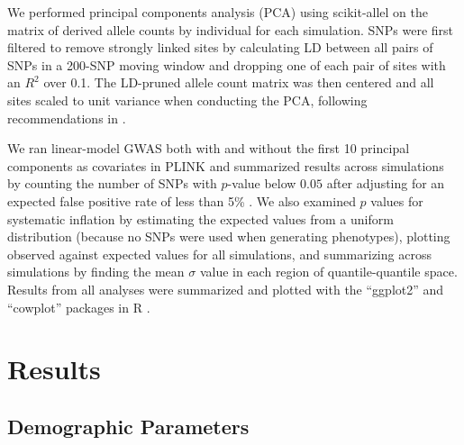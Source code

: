 \documentclass[10pt,twoside,lineno,hidelinks]{preprint}
\begin{document}
We performed principal components analysis (PCA) using scikit-allel \citep{Miles2017} on the matrix of derived allele counts by individual for each simulation. 
SNPs were first filtered to remove strongly linked sites by calculating LD between all pairs of SNPs in a 200-SNP moving window and dropping one of each pair of sites with an $R^2$ over 0.1. The LD-pruned allele count matrix was then centered and all sites scaled to unit variance when conducting the PCA, following recommendations in \citet{Patterson2006}.   

We ran linear-model GWAS both with and without the first 10 principal components as covariates in PLINK and summarized results across simulations by counting the number of SNPs 
with $p$-value below $0.05$ after adjusting for an expected false positive rate of less than 5\% \citep{benjamini2001control}. 
We also examined $p$ values for systematic inflation 
by estimating the expected values from a uniform distribution (because no SNPs were used when generating phenotypes), plotting observed against expected values for all simulations, and summarizing across simulations by finding the mean $\sigma$ value in each region of quantile-quantile space. 
Results from all analyses were summarized and plotted with the ``ggplot2'' \citep{Wickham2016} and ``cowplot'' \citep{Wilke2019} packages in R \citep{Rcore2018}. 


\section{Results}

\subsection{Demographic Parameters}
\end{document}
